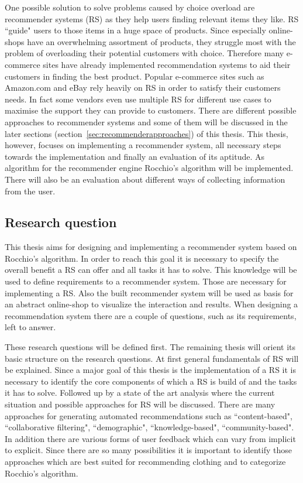 One possible solution to solve problems caused by choice overload are recommender systems (RS) as they help users finding relevant items they like.
RS ``guide" users to those items in a huge space of products.\citep[p.~63]{bollen:2010}
Since especially online-shops have an overwhelming assortment of products, they struggle most with the problem of overloading their potential customers with choice.
Therefore many \gls{e-commerce} sites have already implemented recommendation systems to aid their customers in finding the best product.
Popular e-commerce sites such as Amazon.com and \gls{eBay} rely heavily on RS in order to satisfy their customers needs.
In fact some vendors even use multiple RS for different use cases to maximise the support they can provide to customers.
\citep[p.~158]{schafer:1999}
There are different possible approaches to recommender systems and some of them will be discussed in the later sections (section~\ref{sec:recommenderapproaches}) of this thesis.
This thesis, however, focuses on implementing a recommender system, all necessary steps towards the implementation and finally an evaluation of its aptitude.
As algorithm for the recommender engine Rocchio's algorithm will be implemented.
There will also be an evaluation about different ways of collecting information from the user.


\subsection{Research question}
This thesis aims for designing and implementing a recommender system based on Rocchio's algorithm.
In order to reach this goal it is necessary to specify the overall benefit a RS can offer and all tasks it has to solve.
This knowledge will be used to define requirements to a recommender system.
Those are necessary for implementing a RS.
Also the built recommender system will be used as basis for an abstract online-shop to visualize the interaction and results.
When designing a recommendation system there are a couple of questions, such as its requirements, left to answer.

These research questions will be defined first.
The remaining thesis will orient its basic structure on the research questions.
At first general fundamentals of RS will be explained.
Since a major goal of this thesis is the implementation of a RS it is necessary to identify the core components of which a RS is build of and the tasks it has to solve.
Followed up by a state of the art analysis where the current situation and possible approaches for RS will be discussed.
There are many approaches for generating automated recommendations such as ``content-based", ``collaborative filtering", ``demographic", ``knowledge-based", ``community-based".\citep[p.~10-12]{ricci:2011}
In addition there are various forms of user feedback which can vary from implicit to explicit.\citep[p.~76]{lops:2011}
Since there are so many possibilities it is important to identify those approaches which are best suited for recommending clothing and to categorize Rocchio's algorithm.

